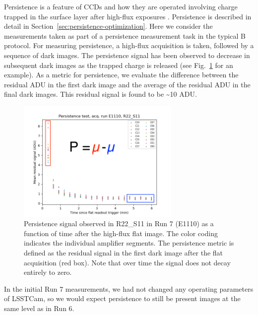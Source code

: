 Persistence is a feature of CCDs and how they are operated involving charge trapped in the
surface layer after high-flux exposures
\cite{DMTN-276}.
Persistence is described in
detail in Section~\ref{sec:persistence-optimization}.
Here we consider the measurements taken as
part of a persistence measurement task in the typical B protocol. For
measuring persistence, a high-flux acquisition is taken, followed by a
sequence of dark images. The persistence signal has been observed to
decrease in subsequent dark images as the trapped charge is released (see Fig.~\ref{fig:persistence-decay} for an example). As a metric for persistence,
we evaluate the difference between the residual ADU in the first dark
image and the average of the residual ADU in the final dark images. This residual signal is found to be \textasciitilde10 ADU.

\begin{figure}[H]
\begin{centering}
\includegraphics[width=0.7\textwidth]{sections/figures/baselineCharacterization/persistence_plot_LSSTCam_R22_S11_u_lsstccs_eo_persistence_E1110_w_2024_35_20240926T235141Z.png}
\caption{Persistence signal observed in R22\_S11 in Run 7 (E1110) as a function of time after the high-flux flat image.  The color coding indicates the individual amplifier segments.  The persistence metric is defined as the residual signal in the first dark image after the flat acquisition (red box).  Note that over time the signal does not decay entirely to zero.}
\label{fig:persistence-decay}
\end{centering}
\end{figure}

In the initial Run 7 measurements, we had not changed any operating
parameters of LSSTCam, so we would expect persistence to still be
present images at the same level as in Run 6.

